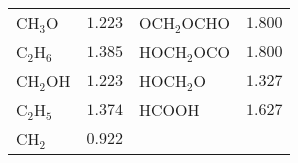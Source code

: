 \documentclass[review,3p,times]{elsarticle}
\begin{document}
\begin{table*}[h]
{\begin{tabular}{llll}
    CH$_3$O &           $1.223$     &                  OCH$_2$OCHO &       $1.800$     \\                        
    C$_2$H$_6$ &           $1.385$     &               HOCH$_2$OCO &       $1.800$     \\                        
    CH$_2$OH &          $1.223$     &                  HOCH$_2$O &         $1.327$     \\                        
    C$_2$H$_5$ &           $1.374$      &              HCOOH &          $1.627$     \\                           
    CH$_2$ &            $0.922$    & &\\
    \hline
   \end{tabular}
}
\end{table*}
\end{document}
